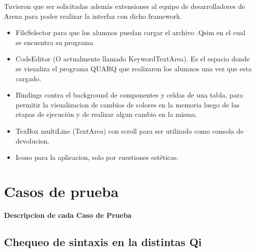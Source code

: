 Tuvieron que ser solicitadas además extensiones al equipo de desarrolladores de Arena para poder realizar la interfaz con dicho framework.

\begin{itemize}
\item FileSelector para que los alumnos puedan cargar el archivo .Qsim en el cual se encuentra su programa
\item CodeEditor (O actualmente llamado KeywordTextArea). Es el espacio donde se visualiza el programa QUARQ que realizaron los alumnos una vez que esta cargado.
\item Bindings contra el background de componentes y celdas de una tabla, para permitir la visualizacion de cambios de colores en la memoria luego de las etapas de ejecución y de realizar algun cambio en la misma.
\item TexBox multiLine (TextArea) con scroll para ser utilizado como consola de devolucion.
\item Icono para la aplicacion, solo por cuestiones estéticas.
\end{itemize}

\section{Casos de prueba}

\item \textbf{Descripcion de cada Caso de Prueba}

\subsection{Chequeo de sintaxis en la distintas Qi}

